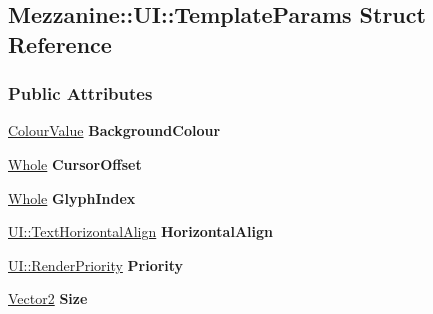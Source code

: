 \hypertarget{structMezzanine_1_1UI_1_1TemplateParams}{
\subsection{Mezzanine::UI::TemplateParams Struct Reference}
\label{structMezzanine_1_1UI_1_1TemplateParams}
}
\subsubsection*{Public Attributes}
\begin{DoxyCompactItemize}
\item 
\hypertarget{structMezzanine_1_1UI_1_1TemplateParams_a2b2a4ce43703f9c0a1f11f270c3f9654}{
\hyperlink{classMezzanine_1_1ColourValue}{ColourValue} {\bfseries BackgroundColour}}
\label{structMezzanine_1_1UI_1_1TemplateParams_a2b2a4ce43703f9c0a1f11f270c3f9654}

\item 
\hypertarget{structMezzanine_1_1UI_1_1TemplateParams_a26bcd105a155002a4532efdf032017b9}{
\hyperlink{namespaceMezzanine_adcbb6ce6d1eb4379d109e51171e2e493}{Whole} {\bfseries CursorOffset}}
\label{structMezzanine_1_1UI_1_1TemplateParams_a26bcd105a155002a4532efdf032017b9}

\item 
\hypertarget{structMezzanine_1_1UI_1_1TemplateParams_af18876e5e4c8bdcc39d5c59837a647dc}{
\hyperlink{namespaceMezzanine_adcbb6ce6d1eb4379d109e51171e2e493}{Whole} {\bfseries GlyphIndex}}
\label{structMezzanine_1_1UI_1_1TemplateParams_af18876e5e4c8bdcc39d5c59837a647dc}

\item 
\hypertarget{structMezzanine_1_1UI_1_1TemplateParams_a8caaf3ad2389933380920f04285ffa1e}{
\hyperlink{namespaceMezzanine_1_1UI_aebbd46e62bb20d958f1915c1ec6cc549}{UI::TextHorizontalAlign} {\bfseries HorizontalAlign}}
\label{structMezzanine_1_1UI_1_1TemplateParams_a8caaf3ad2389933380920f04285ffa1e}

\item 
\hypertarget{structMezzanine_1_1UI_1_1TemplateParams_a72d3b45ef538d46f47c8258a92b99df0}{
\hyperlink{namespaceMezzanine_1_1UI_ac4c753eb6b5d66350a243acc9ce54130}{UI::RenderPriority} {\bfseries Priority}}
\label{structMezzanine_1_1UI_1_1TemplateParams_a72d3b45ef538d46f47c8258a92b99df0}

\item 
\hypertarget{structMezzanine_1_1UI_1_1TemplateParams_a3abbe43f4273cf1dde6ef790fe20d4fb}{
\hyperlink{classMezzanine_1_1Vector2}{Vector2} {\bfseries Size}}
\label{structMezzanine_1_1UI_1_1TemplateParams_a3abbe43f4273cf1dde6ef790fe20d4fb}


\end{DoxyCompactItemize}
